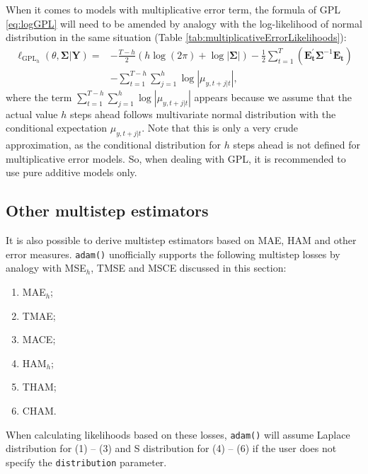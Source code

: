 \documentclass[
]{book}
\providecommand{\tightlist}{%
  \setlength{\itemsep}{0pt}\setlength{\parskip}{0pt}}
\theoremstyle{definition}
\theoremstyle{definition}
\theoremstyle{definition}
\theoremstyle{definition}
\theoremstyle{remark}
\begin{document}
When it comes to models with multiplicative error term, the formula of GPL \eqref{eq:logGPL} will need to be amended by analogy with the log-likelihood of normal distribution in the same situation (Table \ref{tab:multiplicativeErrorLikelihoods}):
\begin{equation}
    \begin{aligned}
    \ell_{\mathrm{GPL}_h}(\theta, \boldsymbol{\Sigma} | \mathbf{Y}) = & -\frac{T-h}{2} \left( h \log(2 \pi) + \log | \boldsymbol{\Sigma}| \right) -\frac{1}{2} \sum_{t=1}^T \left( \mathbf{E_t^\prime} \boldsymbol{\Sigma}^{-1} \mathbf{E_t} \right) \\
                        & -\sum_{t=1}^{T-h} \sum_{j=1}^h \log |\mu_{y,t+j|t}|,
    \end{aligned}
  \label{eq:logGPLMultiplicative}
\end{equation}
where the term \(\sum_{t=1}^{T-h} \sum_{j=1}^h \log |\mu_{y,t+j|t}|\) appears because we assume that the actual value \(h\) steps ahead follows multivariate normal distribution with the conditional expectation \(\mu_{y,t+j|t}\). Note that this is only a very crude approximation, as the conditional distribution for \(h\) steps ahead is not defined for multiplicative error models. So, when dealing with GPL, it is recommended to use pure additive models only.

\hypertarget{other-multistep-estimators}{%
\subsection{Other multistep estimators}\label{other-multistep-estimators}}

It is also possible to derive multistep estimators based on MAE, HAM and other error measures. \texttt{adam()} unofficially supports the following multistep losses by analogy with MSE\(_h\), TMSE and MSCE discussed in this section:

\begin{enumerate}
\def\labelenumi{\arabic{enumi}.}
\tightlist
\item
  MAE\(_h\);
\item
  TMAE;
\item
  MACE;
\item
  HAM\(_h\);
\item
  THAM;
\item
  CHAM.
\end{enumerate}

When calculating likelihoods based on these losses, \texttt{adam()} will assume Laplace distribution for (1) -- (3) and S distribution for (4) -- (6) if the user does not specify the \texttt{distribution} parameter.
\end{document}

